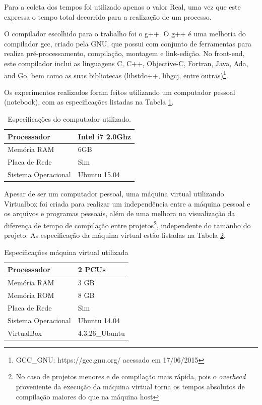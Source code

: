 Para a coleta dos tempos foi utilizado apenas o valor Real, uma vez que este
 expressa o tempo total decorrido para a realização de um processo.

O compilador escolhido para o trabalho foi o g++. O g++ é uma melhoria do
 compilador gcc, criado pela GNU, que possui com conjunto de ferramentas
 para realiza pré-processamento, compilação, montagem e link-edição.
 No front-end,  este compilador inclui as linguagens C, C++, Objective-C,
 Fortran, Java, Ada, and Go, bem como as suas bibliotecas  (libstdc++,
 libgcj, entre outras)\footnote{GCC\_GNU: https://gcc.gnu.org/ acessado
 em 17/06/2015}.


Os experimentos realizados foram feitos utilizando um computador pessoal
 (notebook), com  as especificações  listadas na Tabela 
\ref{tab:especificacoes_hardware}.


\begin{table}[h]
\centering
\begin{tabular}{|l|l|}
	\hline
	Processador         & Intel i7 2.0Ghz \\
	\hline
	Memória RAM         & 6GB             \\
	\hline
	Placa de Rede       & Sim             \\
	\hline
	Sistema Operacional & Ubuntu 15.04 \\
	\hline
\end{tabular}
\caption{Especificações do computador utilizado.}
\label{tab:especificacoes_hardware}
\end{table}


Apesar de ser um computador pessoal, uma máquina virtual utilizando Virtualbox
 foi criada para realizar um independência entre a máquina pessoal e os
 arquivos e programas pessoais, além de uma melhora  na visualização da
 diferença de tempo de compilação entre projetos\footnote{No caso de projetos menores e de compilação mais rápida, pois o 
\textit{overhead} proveniente da execução da máquina virtual torna os tempos
 absolutos de compilação maiores do que na máquina host}, independente do
 tamanho do projeto. As especificação da máquina virtual  estão listadas na
 Tabela \ref{tab:especificacoes_vm}.

\begin{table}[h]
	\centering
	\begin{tabular}{|l|l|}
		\hline
		Processador & 2 PCUs \\
		\hline
		Memória RAM & 3 GB \\
		\hline
		Memória ROM & 8 GB \\
		\hline
		Placa de Rede & Sim \\
		\hline
		Sistema Operacional & Ubuntu 14.04 \\
		\hline
		VirtualBox & 4.3.26\_Ubuntu \\
		\hline
	\end{tabular}
	\caption{Especificações máquina virtual utilizada}
	\label{tab:especificacoes_vm}
\end{table}


